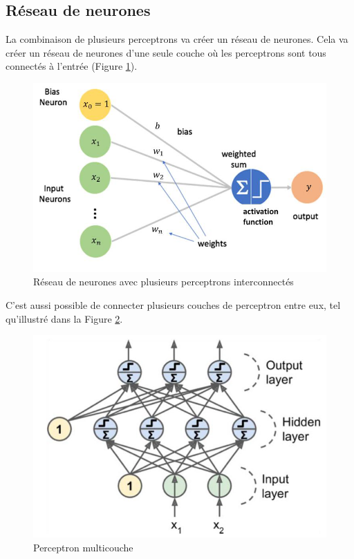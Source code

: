 \subsection{Réseau de neurones}

La combinaison de plusieurs perceptrons va créer un réseau de neurones. Cela va créer un réseau de neurones d'une seule couche où les perceptrons sont tous connectés à l'entrée (Figure \ref{fig:A1_05_reseau_neurones_simple}).

\begin{figure}[H]
    \centering
    \includegraphics[width=0.8\linewidth]{03-tail//A1_fondamentaux_ML//A1_figures/A1_05_reseau_neurones_simple.png}
    \caption{Réseau de neurones avec plusieurs perceptrons interconnectés \cite{zahn_cours_2024}}
    \label{fig:A1_05_reseau_neurones_simple}
\end{figure}

C'est aussi possible de connecter plusieurs couches de perceptron entre eux, tel qu'illustré dans la Figure \ref{fig:A1_06_perceptron_multicouche}.

\begin{figure}[H]
    \centering
    \includegraphics[width=0.75\linewidth]{03-tail//A1_fondamentaux_ML//A1_figures/A1_06_perceptron_multicouche.png}
    \caption{Perceptron multicouche \cite{zahn_cours_2024}}
    \label{fig:A1_06_perceptron_multicouche}
\end{figure}


